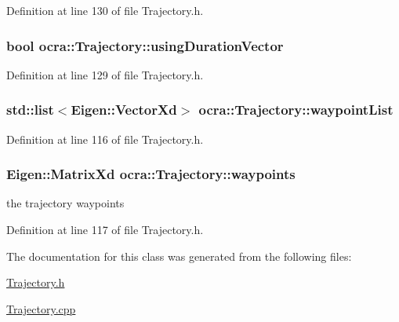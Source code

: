 Definition at line 130 of file Trajectory.\+h.

\subsubsection[{\texorpdfstring{using\+Duration\+Vector}{usingDurationVector}}]{\setlength{\rightskip}{0pt plus 5cm}bool ocra\+::\+Trajectory\+::using\+Duration\+Vector\hspace{0.3cm}{\ttfamily [protected]}}\hypertarget{classocra_1_1Trajectory_af31e825f10a3b98840f9054f1741b289}{}\label{classocra_1_1Trajectory_af31e825f10a3b98840f9054f1741b289}


Definition at line 129 of file Trajectory.\+h.

\subsubsection[{\texorpdfstring{waypoint\+List}{waypointList}}]{\setlength{\rightskip}{0pt plus 5cm}std\+::list$<$Eigen\+::\+Vector\+Xd$>$ ocra\+::\+Trajectory\+::waypoint\+List\hspace{0.3cm}{\ttfamily [protected]}}\hypertarget{classocra_1_1Trajectory_a37630b26ba23826298167f37534ff6f3}{}\label{classocra_1_1Trajectory_a37630b26ba23826298167f37534ff6f3}


Definition at line 116 of file Trajectory.\+h.

\subsubsection[{\texorpdfstring{waypoints}{waypoints}}]{\setlength{\rightskip}{0pt plus 5cm}Eigen\+::\+Matrix\+Xd ocra\+::\+Trajectory\+::waypoints\hspace{0.3cm}{\ttfamily [protected]}}\hypertarget{classocra_1_1Trajectory_ab0514f8c3c8d4827b19dc863ff800b43}{}\label{classocra_1_1Trajectory_ab0514f8c3c8d4827b19dc863ff800b43}
the trajectory waypoints 

Definition at line 117 of file Trajectory.\+h.



The documentation for this class was generated from the following files\+:\begin{DoxyCompactItemize}
\item 
\hyperlink{Trajectory_8h}{Trajectory.\+h}\item 
\hyperlink{Trajectory_8cpp}{Trajectory.\+cpp}\end{DoxyCompactItemize}
